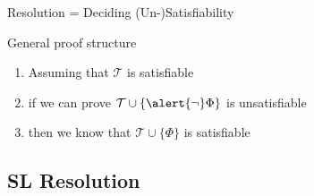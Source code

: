 \documentclass[presentation]{beamer}\mode<presentation>{\usetheme{AMSBolognaFC}}
\begin{document}
\begin{frame}[allowframebreaks]{Resolution = Deciding (Un-)Satisfiability}
    \begin{exampleblock}{General proof structure}
        \begin{enumerate}
            \item Assuming that $\mathcal{T}$ is satisfiable
            
            \item if we can prove $\mathcal{T} \cup \{ \alert{\neg} \Phi \}$ is unsatisfiable
            
            \item then we know that $\mathcal{T} \cup \{ \Phi \}$ is satisfiable
        \end{enumerate}
    \end{exampleblock}
\end{frame}

\subsection{SL Resolution}
\end{document}
